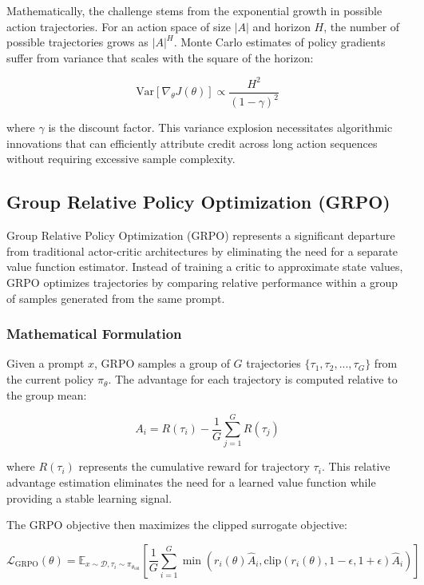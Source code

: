 Mathematically, the challenge stems from the exponential growth in possible action trajectories. For an action space of size $|A|$ and horizon $H$, the number of possible trajectories grows as $|A|^H$. Monte Carlo estimates of policy gradients suffer from variance that scales with the square of the horizon:

$$\text{Var}[\nabla_\theta J(\theta)] \propto \frac{H^2}{(1-\gamma)^2}$$

where $\gamma$ is the discount factor. This variance explosion necessitates algorithmic innovations that can efficiently attribute credit across long action sequences without requiring excessive sample complexity.

\subsection{Group Relative Policy Optimization (GRPO)}

Group Relative Policy Optimization (GRPO) represents a significant departure from traditional actor-critic architectures by eliminating the need for a separate value function estimator. Instead of training a critic to approximate state values, GRPO optimizes trajectories by comparing relative performance within a group of samples generated from the same prompt.

\subsubsection{Mathematical Formulation}

Given a prompt $x$, GRPO samples a group of $G$ trajectories $\{\tau_1, \tau_2, ..., \tau_G\}$ from the current policy $\pi_\theta$. The advantage for each trajectory is computed relative to the group mean:

$$A_i = R(\tau_i) - \frac{1}{G}\sum_{j=1}^{G} R(\tau_j)$$

where $R(\tau_i)$ represents the cumulative reward for trajectory $\tau_i$. This relative advantage estimation eliminates the need for a learned value function while providing a stable learning signal.

The GRPO objective then maximizes the clipped surrogate objective:

$$\mathcal{L}_{\text{GRPO}}(\theta) = \mathbb{E}_{x \sim \mathcal{D}, \tau_i \sim \pi_{\theta_{\text{old}}}} \left[ \frac{1}{G}\sum_{i=1}^{G} \min\left( r_i(\theta)\hat{A}_i, \text{clip}(r_i(\theta), 1-\epsilon, 1+\epsilon)\hat{A}_i \right) \right]$$

